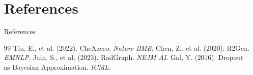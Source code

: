 \documentclass[aspectratio=169]{beamer}
\begin{document}
\section{References}
\begin{frame}[allowframebreaks]{References}
  \scriptsize
  
  \begin{thebibliography}{99}
   Tiu, E., et al. (2022). CheXzero. \emph{Nature BME}.
   Chen, Z., et al. (2020). R2Gen. \emph{EMNLP}.
   Jain, S., et al. (2023). RadGraph. \emph{NEJM AI}.
   Gal, Y. (2016). Dropout as Bayesian Approximation. \emph{ICML}.
  \end{thebibliography}
\end{frame}
\end{document}
